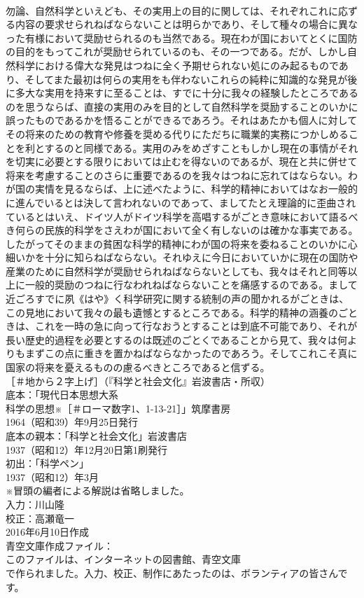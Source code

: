 \documentclass[8pt]{extreport}
\begin{document}
\begin{CJK}{UTF8}{min}
\\	勿論、自然科学といえども、その実用上の目的に関しては、それぞれこれに応ずる内容の要求せられねばならないことは明らかであり、そして種々の場合に異なった有様において奨励せられるのも当然である。現在わが国においてとくに国防の目的をもってこれが奨励せられているのも、その一つである。だが、しかし自然科学における偉大な発見はつねに全く予期せられない処にのみ起るものであり、そしてまた最初は何らの実用をも伴わないこれらの純粋に知識的な発見が後に多大な実用を持来すに至ることは、すでに十分に我々の経験したところであるのを思うならば、直接の実用のみを目的として自然科学を奨励することのいかに誤ったものであるかを悟ることができるであろう。それはあたかも個人に対してその将来のための教育や修養を奨める代りにただちに職業的実務につかしめることを利とするのと同様である。実用のみをめざすこともしかし現在の事情がそれを切実に必要とする限りにおいては止むを得ないのであるが、現在と共に併せて将来を考慮することのさらに重要であるのを我々はつねに忘れてはならない。わが国の実情を見るならば、上に述べたように、科学的精神においてはなお一般的に進んでいるとは決して言われないのであって、ましてたとえ理論的に歪曲されているとはいえ、ドイツ人がドイツ科学を高唱するがごとき意味において語るべき何らの民族的科学をさえわが国において全く有しないのは確かな事実である。したがってそのままの貧困な科学的精神にわが国の将来を委ねることのいかに心細いかを十分に知らねばならない。それゆえに今日においていかに現在の国防や産業のために自然科学が奨励せられねばならないとしても、我々はそれと同等以上に一般的奨励のつねに行なわれねばならないことを痛感するのである。まして近ごろすでに夙《はや》く科学研究に関する統制の声の聞かれるがごときは、この見地において我々の最も遺憾とするところである。科学的精神の涵養のごときは、これを一時の急に向って行なおうとすることは到底不可能であり、それが長い歴史的過程を必要とするのは既述のごとくであることから見て、我々は何よりもまずこの点に重きを置かねばならなかったのであろう。そしてこれこそ真に国家の将来を憂えるものの慮るべきところであると信ずる。
\\	［＃地から２字上げ］（『科学と社会文化』岩波書店・所収）
\\	底本：「現代日本思想大系　
\\	科学の思想※［＃ローマ数字1、1-13-21］」筑摩書房
\\	1964（昭和39）年9月25日発行
\\	底本の親本：「科学と社会文化」岩波書店
\\	1937（昭和12）年12月20日第1刷発行
\\	初出：「科学ペン」
\\	1937（昭和12）年3月
\\	※冒頭の編者による解説は省略しました。
\\	入力：川山隆
\\	校正：高瀬竜一
\\	2016年6月10日作成
\\	青空文庫作成ファイル：
\\	このファイルは、インターネットの図書館、青空文庫
\\	で作られました。入力、校正、制作にあたったのは、ボランティアの皆さんです。
\end{CJK}
\end{document}
